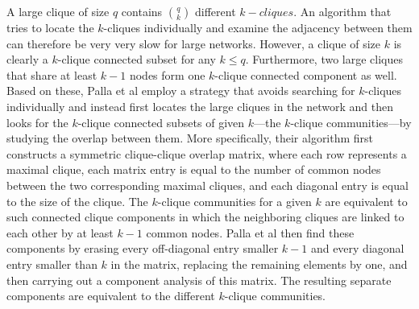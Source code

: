 A large clique of size $q$ contains $\binom{q}{k}$ different $k-cliques$.
An algorithm that tries to locate the $k$-cliques individually and examine the adjacency
between them can therefore be very very slow for large networks. However, a clique of size $k$
is clearly a $k$-clique connected subset for any $k \leq q$. Furthermore, two large
cliques that share at least $k-1$ nodes form one $k$-clique connected component as well.
Based on these, Palla et al employ a strategy that avoids searching for $k$-cliques individually
and instead first locates the large cliques in the network and then looks for the $k$-clique connected subsets of given $k$---the $k$-clique communities---by studying the overlap between them.
More specifically, their algorithm first constructs a symmetric clique-clique overlap matrix, 
where each row represents a maximal clique, each matrix entry is equal to the number of common nodes between the two corresponding maximal cliques, and each diagonal entry is equal to the
size of the clique. The $k$-clique communities for a given $k$ are equivalent to such connected 
clique components in which the neighboring cliques are linked to each other by at least $k-1$ common nodes. Palla et al then find these components by erasing every off-diagonal entry smaller $k-1$ and every diagonal entry smaller than $k$ in the matrix, replacing the remaining elements by one, and then carrying out a component analysis of this matrix. The resulting separate components are equivalent to the different $k$-clique communities.
       


